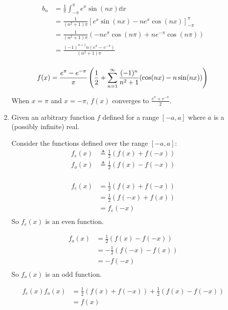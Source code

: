 \documentclass[10pt,\jkfside,a4paper]{article}
\begin{document}
\begin{enumerate}
\begin{enumerate}
\[
\begin{split}
b_n &= \frac{1}{\pi}\int^\pi_{-\pi} e^x\sin(nx) \dd{x} \\
	&= \frac{1}{(n^2 + 1)\pi}[e^x\sin(nx) - ne^x\cos(nx)]^\pi_{-\pi} \\
	&= \frac{1}{(n^2 + 1)\pi}(-ne^\pi\cos(n\pi) + ne^{-\pi}\cos(n\pi)) \\
	&= \frac{(-1)^{n+1}n(e^\pi - e^{-\pi})}{(n^2 + 1)\pi} \\
\end{split}
\]

\[
f(x) = \frac{e^\pi - e^{-\pi}}{\pi}\left(\frac{1}{2} + \sum^\infty_{n=1}\frac{(-1)^n}{n^2 + 1}(\cos(nx) - n\sin(nx))\right) \\
\]

When $x = \pi$ and $x = -\pi$, $f(x)$ converges to $\frac{e^\pi + e^{-\pi}}{2}$.

\item 

Given an arbitrary function $f$ defined for a range $[-a, a]$ where $a$ is a 
(possibly infinite) real.

Consider the functions defined over the range $[-a, a]$:
\[
\begin{split}
f_e(x) &\triangleq \frac{1}{2}(f(x) + f(-x)) \\
f_o(x) &\triangleq \frac{1}{2}(f(x) - f(-x)) \\
\end{split}
\]

\[
\begin{split}
f_e(x) &= \frac{1}{2}(f(x) + f(-x)) \\
	   &= \frac{1}{2}(f(-x) + f(x)) \\
	   &= f_e(-x) \\
\end{split}
\]
So $f_e(x)$ is an even function.

\[
\begin{split}
f_o(x) &= \frac{1}{2}(f(x) - f(-x)) \\
	   &= -\frac{1}{2}(f(-x) - f(x)) \\
	   &= -f(-x) \\
\end{split}
\]
So $f_o(x)$ is an odd function.

\[
\begin{split}
f_e(x) f_o(x) &= \frac{1}{2}(f(x) + f(-x)) + \frac{1}{2}(f(x) - f(-x)) \\
			  &= f(x) \\
\end{split}
\]


\end{enumerate}
\end{enumerate}
\end{document}
